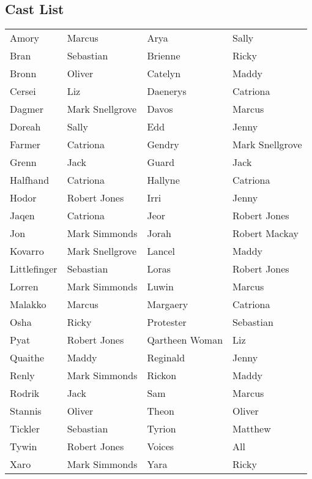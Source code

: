 \subsection*{Cast List}
\begin{tabular}{ll|ll}\\
Amory & Marcus &  Arya & Sally\\
Bran & Sebastian &  Brienne & Ricky\\
Bronn & Oliver &  Catelyn & Maddy\\
Cersei & Liz &  Daenerys & Catriona\\
Dagmer & Mark Snellgrove &  Davos & Marcus\\
Doreah & Sally &  Edd & Jenny\\
Farmer & Catriona &  Gendry & Mark Snellgrove\\
Grenn & Jack &  Guard & Jack\\
Halfhand & Catriona &  Hallyne & Catriona\\
Hodor & Robert Jones &  Irri & Jenny\\
Jaqen & Catriona &  Jeor & Robert Jones\\
Jon & Mark Simmonds &  Jorah & Robert Mackay\\
Kovarro & Mark Snellgrove &  Lancel & Maddy\\
Littlefinger & Sebastian &  Loras & Robert Jones\\
Lorren & Mark Simmonds &  Luwin & Marcus\\
Malakko & Marcus &  Margaery & Catriona\\
Osha & Ricky &  Protester & Sebastian\\
Pyat & Robert Jones &  Qartheen Woman & Liz\\
Quaithe & Maddy &  Reginald & Jenny\\
Renly & Mark Simmonds &  Rickon & Maddy\\
Rodrik & Jack &  Sam & Marcus\\
Stannis & Oliver &  Theon & Oliver\\
Tickler & Sebastian &  Tyrion & Matthew\\
Tywin & Robert Jones &  Voices & All\\
Xaro & Mark Simmonds &  Yara & Ricky\\
\end{tabular}
